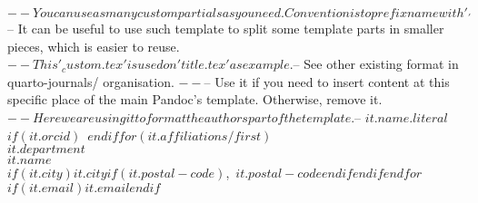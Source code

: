 $-- You can use as many custom partials as you need. Convention is to prefix name with '_'
$-- It can be useful to use such template to split some template parts in smaller pieces, which is easier to reuse.
$-- This '_custom.tex' is used on 'title.tex' as example.
$-- See other existing format in quarto-journals/ organisation.
$-- %
$-- Use it if you need to insert content at this specific place of the main Pandoc's template. Otherwise, remove it.
$-- Here we are using it to format the authors part of the template.
$-- %
\textbf{$it.name.literal$}$if(it.orcid)$~$endif$$for(it.affiliations/first)$\\$it.department$\\$it.name$\\$if(it.city)$$it.city$$if(it.postal-code)$,\ $it.postal-code$$endif$$endif$$endfor$\\$if(it.email)$\texttt{\href{mailto:$it.email$}{$it.email$}}$endif$